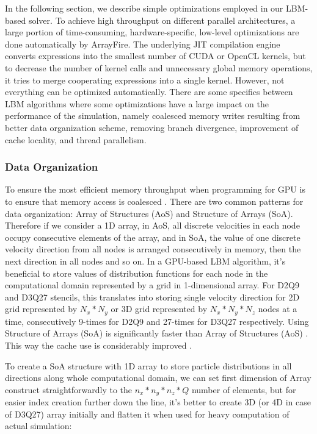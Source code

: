 In the following section, we describe simple optimizations employed in our LBM-based solver. To achieve high throughput on different parallel architectures, a large portion of time-consuming, hardware-specific, low-level optimizations are done automatically by ArrayFire. The underlying JIT compilation engine converts expressions into the smallest number of CUDA or OpenCL kernels, but to decrease the number of kernel calls and unnecessary global memory operations, it tries to merge cooperating expressions into a single kernel. However, not everything can be optimized automatically. There are some specifics between LBM algorithms where some optimizations have a large impact on the performance of the simulation, namely coalesced memory writes resulting from better data organization scheme, removing branch divergence, improvement of cache locality, and thread parallelism.

\subsubsection{Data Organization}
To ensure the most efficient memory throughput when programming for GPU is to ensure that memory access is coalesced \cite{tranPerformanceOptimization3D2017}. There are two common patterns for data organization: Array of Structures (AoS) and Structure of Arrays (SoA). Therefore if we consider a 1D array, in AoS, all discrete velocities in each node occupy consecutive elements of the array, and in SoA, the value of one discrete velocity direction from all nodes is arranged consecutively in memory, then the next direction in all nodes and so on. In a GPU-based LBM algorithm, it's beneficial to store values of distribution functions for each node in the computational domain represented by a grid in 1-dimensional array. For D2Q9 and D3Q27 stencils, this translates into storing single velocity direction for 2D grid represented by $N_x * N_y$ or 3D grid represented by $N_x * N_y * N_z$ nodes at a time, consecutively 9-times for D2Q9 and 27-times for D3Q27 respectively. Using Structure of Arrays (SoA) is significantly faster than Array of Structures (AoS) \cite{tranPerformanceOptimization3D2017, delboscOptimizedImplementationLattice2014}. This way the cache use is considerably improved \cite{Mawson2014InteractiveFI}.

To create a SoA structure with 1D array to store particle distributions in all directions along whole computational domain, we can set first dimension of Array construct straightforwardly to the $n_x*n_y*n_z*Q$ number of elements, but for easier index creation further down the line, it's better to create 3D (or 4D in case of D3Q27) array initially and flatten it when used for heavy computation of actual simulation:

